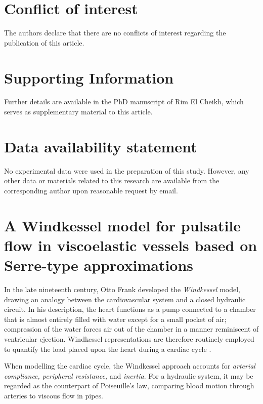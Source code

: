 \documentclass[alpha-refs, 12pt]{wiley-article}
\begin{document}
\section*{Conflict of interest}

The authors declare that there are no conflicts of interest regarding the publication of this article.

\section*{Supporting Information}

Further details are available in the PhD manuscript of Rim El Cheikh, which serves as supplementary material to this article.

\section*{Data availability statement}

No experimental data were used in the preparation of this study. However, any other data or materials related to this research are available from the corresponding author upon reasonable request by email.

\printendnotes

\printglossary[type=\acronymtype]



\appendix
\section{A Windkessel model for pulsatile flow in viscoelastic vessels based on Serre-type approximations}\label{sec:windkessel}

In the late nineteenth century, Otto Frank developed the \emph{Windkessel} model, drawing an analogy between the cardiovascular system and a closed hydraulic circuit. In his description, the heart functions as a pump connected to a chamber that is almost entirely filled with water except for a small pocket of air; compression of the water forces air out of the chamber in a manner reminiscent of ventricular ejection. Windkessel representations are therefore routinely employed to quantify the load placed upon the heart during a cardiac cycle \cite{Catanho2012}.

When modelling the cardiac cycle, the Windkessel approach accounts for \emph{arterial compliance, peripheral resistance,} and \emph{inertia}. For a hydraulic system, it may be regarded as the counterpart of Poiseuille's law, comparing blood motion through arteries to viscous flow in pipes.
\end{document}
